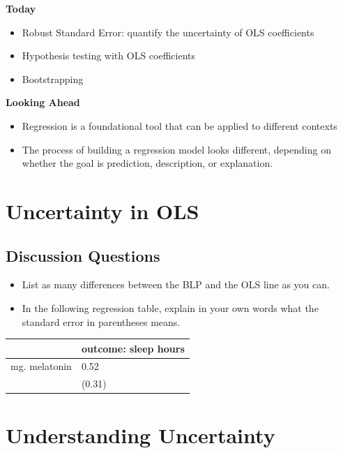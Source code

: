 \documentclass[
]{book}
\providecommand{\tightlist}{%
  \setlength{\itemsep}{0pt}\setlength{\parskip}{0pt}}
\theoremstyle{definition}
\theoremstyle{definition}
\theoremstyle{definition}
\theoremstyle{definition}
\theoremstyle{remark}
\begin{document}
\textbf{Today}

\begin{itemize}
\tightlist
\item
  Robust Standard Error: quantify the uncertainty of OLS coefficients
\item
  Hypothesis testing with OLS coefficients
\item
  Bootstrapping
\end{itemize}

\textbf{Looking Ahead}

\begin{itemize}
\tightlist
\item
  Regression is a foundational tool that can be applied to different contexts
\item
  The process of building a regression model looks different, depending on whether the goal is prediction, description, or explanation.
\end{itemize}

\section{Uncertainty in OLS}\label{uncertainty-in-ols}

\subsection{Discussion Questions}\label{discussion-questions-1}

\begin{itemize}
\tightlist
\item
  List as many differences between the BLP and the OLS line as you can.
\item
  In the following regression table, explain in your own words what the standard error in parentheses means.
\end{itemize}

\begin{longtable}[]{@{}ll@{}}
\toprule\noalign{}
& outcome: sleep hours \\
\midrule\noalign{}
\endhead
\bottomrule\noalign{}
\endlastfoot
mg. melatonin & 0.52 \\
& (0.31) \\
\end{longtable}

\section{Understanding Uncertainty}\label{understanding-uncertainty}
\end{document}
